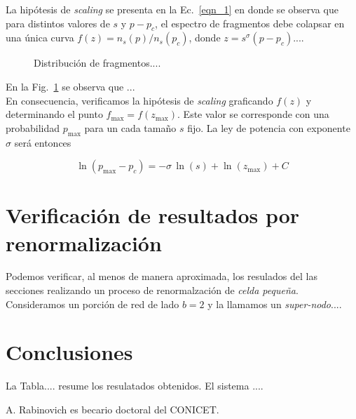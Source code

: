 \documentclass[%
 reprint,
 amsmath,amssymb,
 aps,
spanish]{revtex4-1}
\begin{document}
La hip\'otesis de \emph{scaling} se presenta en la Ec.~\ref{eqn_1} en donde se observa que para distintos valores de $s$ y $p-p_c$, el espectro de fragmentos debe colapsar en una \'unica curva $f(z)=n_s(p)/n_s(p_c)$, donde $z=s^\sigma(p-p_c)$.... 

\begin{figure}[b]
\begin{center}
\caption{Distribuci\'on de fragmentos.... }\label{fig_1}
\end{center}
\end{figure}

En la Fig.~\ref{fig_1} se observa que ... \\


En consecuencia, verificamos la hip\'otesis de \emph{scaling} graficando $f(z)$  y determinando el punto $f_\mathrm{max}=f(z_\mathrm{max})$. Este valor se corresponde con una probabilidad $p_\mathrm{max}$ para un cada tama\~no $s$ fijo. La ley de potencia con exponente $\sigma$ ser\'a entonces

 
\begin{equation}
\ln(p_\mathrm{max}-p_c)=-\sigma\,\ln(s)+\ln(z_\mathrm{max})+C\label{eqn_3}
\end{equation}


\section{\label{R} Verificaci\'on de resultados por renormalizaci\'on}

Podemos verificar, al menos de manera aproximada, los resulados del las secciones realizando un proceso de renormalzaci\'on de \emph{celda peque\~na}. Consideramos un porci\'on de red de lado $b=2$ y la llamamos un \emph{super-nodo}....

\section{\label{conclusions}Conclusiones}

La Tabla.... resume los resulatados obtenidos. El sistema ....


\begin{acknowledgments}
A. Rabinovich es becario doctoral del CONICET. 
\end{acknowledgments}

\appendix
\end{document}
